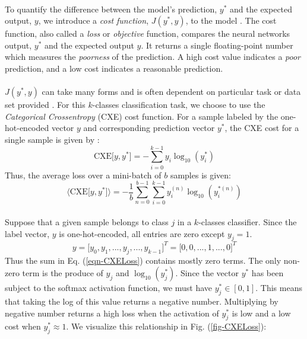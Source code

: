 \documentclass[12pt,letterpaper]{article}
\begin{document}
\paragraph*{}To quantify the difference between the model's prediction, $y^*$ and the expected output, $y$, we introduce a \textit{cost function}, $J(y^*,y)$, to the model \cite{Goodfellow,James}. The cost function, also called a \textit{loss} or \textit{objective} function, compares the neural networks output, $y^*$ and the expected output $y$. It returns a single floating-point number which measures the \textit{poorness} of the prediction. A high cost value indicates a \textit{poor} prediction, and a low cost indicates a reasonable prediction. 

\paragraph*{}$J(y^*,y)$ can take many forms and is often dependent on particular task or data set provided \cite{James}. For this $k$-classes classification task, we choose to use the \textit{Categorical Crossentropy} (CXE) cost function. For a sample labeled by the one-hot-encoded vector $y$ and corresponding prediction vector $y^*$, the CXE cost for a single sample is given by \cite{Goodfellow,Virtanen}:
\begin{equation}
\label{eqn-CXELoss}
\text{CXE}\big[ y , y^* \big] = - \sum_{i=0}^{k-1} y_i \log_{10}(y^*_i) 
\end{equation}
Thus, the average loss over a mini-batch of $b$ samples is given:
\begin{equation}
\label{eqn-CXELossAvg}
\big\langle \text{CXE}\big[ y , y^* \big]\big\rangle = 
- \frac{1}{b}\sum_{n=0}^{b-1}\sum_{i=0}^{k-1} y_i^{(n)} \log_{10}(y^{*(n)}_i) 
\end{equation}

\paragraph*{}Suppose that a given sample belongs to class $j$ in a $k$-classes classifier. Since the label vector, $y$ is one-hot-encoded, all entries are zero except $y_{j} = 1$.
\begin{equation}
y = \big[y_0,y_1, ... , y_{j} , ..., y_{k-1} \big]^T  = 
\big[0,0, ... , 1 , ...,0 \big]^T
\end{equation}
Thus the sum in Eq. (\ref{eqn-CXELoss}) contains mostly zero terms. The only non-zero term is the produce of $y_j$ and $\log_{10}(y^*_j)$. Since the vector $y^*$ has been subject to the softmax activation function, we must have $y^*_j \in [0,1]$. This means that taking the log of this value returns a negative number. Multiplying by negative number returns a high loss when the activation of $y^*_j$ is low and a low cost when $y^*_j \approx 1$. We visualize this relationship in Fig. (\ref{fig-CXELoss}):
\end{document}
